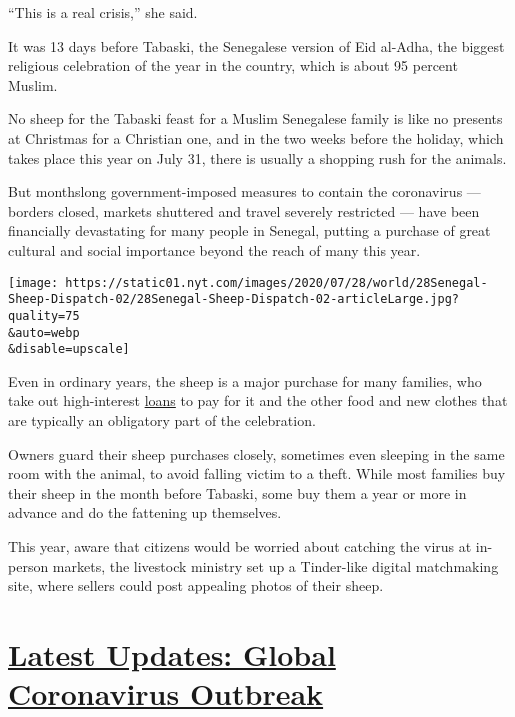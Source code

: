 ``This is a real crisis,'' she said.

It was 13 days before Tabaski, the Senegalese version of Eid al-Adha,
the biggest religious celebration of the year in the country, which is
about 95 percent Muslim.

No sheep for the Tabaski feast for a Muslim Senegalese family is like no
presents at Christmas for a Christian one, and in the two weeks before
the holiday, which takes place this year on July 31, there is usually a
shopping rush for the animals.

But monthslong government-imposed measures to contain the coronavirus
--- borders closed, markets shuttered and travel severely restricted ---
have been financially devastating for many people in Senegal, putting a
purchase of great cultural and social importance beyond the reach of
many this year.

\texttt{[image: https://static01.nyt.com/images/2020/07/28/world/28Senegal-Sheep-Dispatch-02/28Senegal-Sheep-Dispatch-02-articleLarge.jpg?quality=75\\\&auto=webp\\\&disable=upscale]}

Even in ordinary years, the sheep is a major purchase for many families,
who take out high-interest
\href{https://www.boaniger.com/particuliers/prets/pret-tabaski/}{loans}
to pay for it and the other food and new clothes that are typically an
obligatory part of the celebration.

Owners guard their sheep purchases closely, sometimes even sleeping in
the same room with the animal, to avoid falling victim to a theft. While
most families buy their sheep in the month before Tabaski, some buy them
a year or more in advance and do the fattening up themselves.

This year, aware that citizens would be worried about catching the virus
at in-person markets, the livestock ministry set up a Tinder-like
digital matchmaking site, where sellers could post appealing photos of
their sheep.

\hypertarget{latest-updates-global-coronavirus-outbreak}{%
\section{\texorpdfstring{\href{https://www.nytimes.com/2020/08/01/world/coronavirus-covid-19.html?action=click\&pgtype=Article\&state=default\&region=MAIN_CONTENT_1\&context=storylines_live_updates}{Latest
Updates: Global Coronavirus
Outbreak}}{Latest Updates: Global Coronavirus Outbreak}}\label{latest-updates-global-coronavirus-outbreak}}

